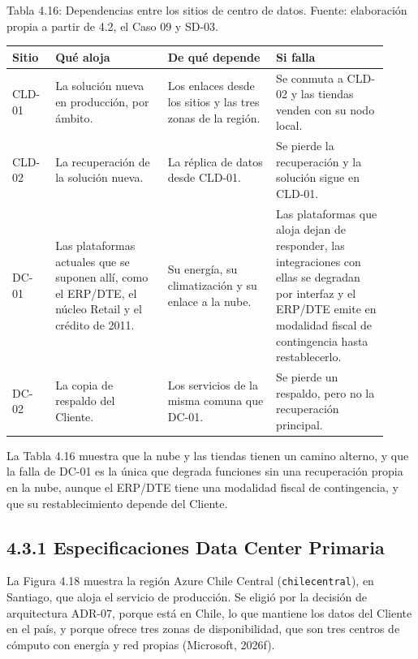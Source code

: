 \documentclass[11pt]{article}
\begin{document}
\par\vspace{0pt plus 10\baselineskip}\vspace{0pt plus -10\baselineskip}

Tabla 4.16: Dependencias entre los sitios de centro de datos. Fuente: elaboración propia a partir de 4.2, el Caso 09 y SD-03.\par\nopagebreak
\begin{longtable}{@{}p{0.106\linewidth}p{0.279\linewidth}p{0.26\linewidth}p{0.279\linewidth}@{}}
\toprule Sitio & Qué aloja & De qué depende & Si falla \\
\midrule\endhead\bottomrule\endlastfoot
CLD-01 & La solución nueva en producción, por ámbito. & Los enlaces desde los sitios y las tres zonas de la región. & Se conmuta a CLD-02 y las tiendas venden con su nodo local. \\
CLD-02 & La recuperación de la solución nueva. & La réplica de datos desde CLD-01. & Se pierde la recuperación y la solución sigue en CLD-01. \\
DC-01 & Las plataformas actuales que se suponen allí, como el ERP/DTE, el núcleo Retail y el crédito de 2011. & Su energía, su climatización y su enlace a la nube. & Las plataformas que aloja dejan de responder, las integraciones con ellas se degradan por interfaz y el ERP/DTE emite en modalidad fiscal de contingencia hasta restablecerlo. \\
DC-02 & La copia de respaldo del Cliente. & Los servicios de la misma comuna que DC-01. & Se pierde un respaldo, pero no la recuperación principal. \\
\end{longtable}

La Tabla 4.16 muestra que la nube y las tiendas tienen un camino alterno, y que la falla de DC-01 es la única que degrada funciones sin una recuperación propia en la nube, aunque el ERP/DTE tiene una modalidad fiscal de contingencia, y que su restablecimiento depende del Cliente.

\subsection{4.3.1 Especificaciones Data Center Primaria}

La Figura 4.18 muestra la región Azure Chile Central (\texttt{chilecentral}), en Santiago, que aloja el servicio de producción. Se eligió por la decisión de arquitectura ADR-07, porque está en Chile, lo que mantiene los datos del Cliente en el país, y porque ofrece tres zonas de disponibilidad, que son tres centros de cómputo con energía y red propias (Microsoft, 2026f).
\end{document}
